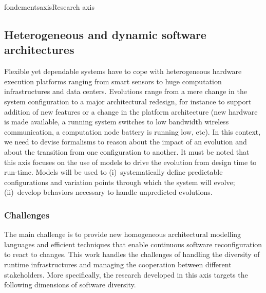 \documentclass{ra2018}
\begin{document}
\begin{module}{fondements}{axis}{Research axis}




\subsection{Heterogeneous and dynamic software architectures}
\label{sec:axis-runtime}



Flexible yet dependable systems have to cope with heterogeneous hardware execution platforms ranging from smart sensors to huge computation infrastructures and data centers. Evolutions range from a mere change in the system configuration to a major architectural redesign,  for instance to support addition of new features or a change in the platform architecture (new hardware is made available, a running system switches to low bandwidth wireless communication, a computation node battery is running low, etc).
In this context, we need to devise formalisms to reason about the impact of an evolution and about the transition from one configuration to another.
It must be noted that this axis focuses on the use of models to drive the evolution from design time to run-time. 
Models will be used to (i)~systematically define predictable configurations and variation points through which the system will evolve;
(ii)~develop behaviors necessary to handle unpredicted evolutions.

\subsubsection*{Challenges} 

The main challenge is to provide new homogeneous architectural modelling languages and efficient techniques that enable continuous software reconfiguration to react to changes. This work handles the challenges of handling the diversity of runtime infrastructures and managing the cooperation between different stakeholders. More specifically, the research developed in this axis targets the following dimensions of software diversity.


\end{module}
\end{document}
